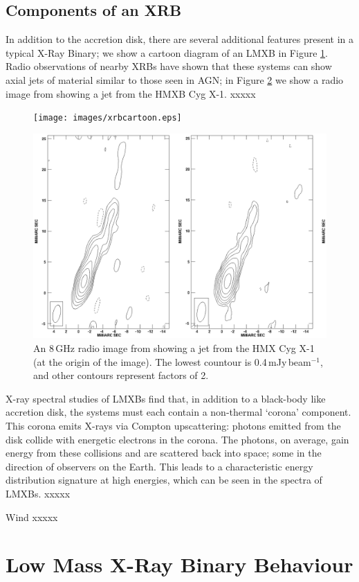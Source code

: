\subsection{Components of an XRB}

\par In addition to the accretion disk, there are several additional features present in a typical X-Ray Binary; we show a cartoon diagram of an LMXB in Figure \ref{fig:xrbcartoon}.   Radio observations of nearby XRBs have shown that these systems can show axial jets of material similar to those seen in AGN; in Figure \ref{fig:jet} we show a radio image from \citet{Stirling_jet} showing a jet from the HMXB Cyg X-1. xxxxx

\begin{figure}
    \texttt{[image: images/xrbcartoon.eps]}
    \captionsetup{singlelinecheck=off}
    \caption{}
   \label{fig:xrbcartoon}
\end{figure}

\begin{figure}
   \centering
    \includegraphics[width=0.6\columnwidth, trim = 17mm 0mm 17mm 0mm, clip]{images/jet.eps}
    \captionsetup{singlelinecheck=off}
    \caption{An 8\,GHz radio image from \citet{Stirling_Jet} showing a jet from the HMX Cyg X-1 (at the origin of the image).  The lowest countour is 0.4\,mJy\,beam$^{-1}$, and other contours represent factors of 2.}
   \label{fig:jet}
\end{figure}

\par X-ray spectral studies of LMXBs find that, in addition to a black-body like accretion disk, the systems must each contain a non-thermal `corona' component.  This corona emits X-rays via Compton upscattering: photons emitted from the disk collide with energetic electrons in the corona.  The photons, on average, gain energy from these collisions and are scattered back into space; some in the direction of observers on the Earth.  This leads to a characteristic energy distribution signature at high energies, which can be seen in the spectra of LMXBs. xxxxx
\par Wind xxxxx



\section{Low Mass X-Ray Binary Behaviour}